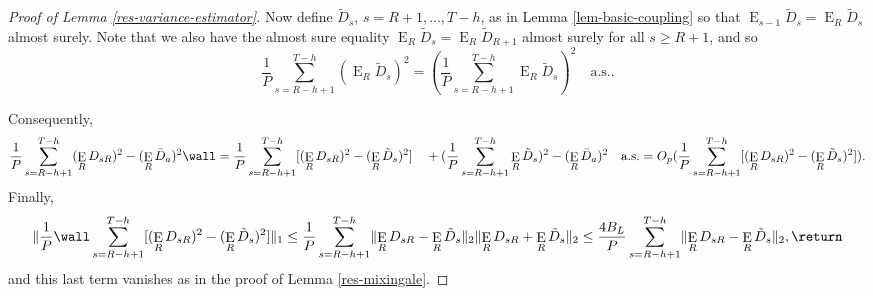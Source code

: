 \documentclass[11pt]{article}
\DeclareMathOperator{\E}{E}
\newcommand{\oosA}{\bar{D}_a}
\newcommand{\oosSum}[2]{\ensuremath{\sum_{#1=R-\h+#2}^{T-\h}}}
\newcommand{\h}{h}
\begin{document}
\begin{proof}[Proof of Lemma \ref{res-variance-estimator}]
Now define $\tilde D_s$, $s = R+1,\dots,T-\h$, as in Lemma
\ref{lem-basic-coupling} so that $\E_{s-1} \tilde D_s = \E_R \tilde
D_s$ almost surely.  Note that we also have the almost sure equality
$\E_R \tilde D_s = \E_R \tilde D_{R+1}$ almost surely for all $s\geq R+1$,
and so
\[
\frac1P \oosSum{s}{1} (\E_R \tilde D_s)^2 = (\frac1P \oosSum{s}{1} \E_R
\tilde D_s)^2 \quad \text{a.s..}
\]

Consequently,
\[
\frac1P \oosSum{s}{1} (\E_R D_{sR})^2 - (\E_R\oosA)^2 \wall = 
\frac1P \oosSum{s}{1} [(\E_R D_{sR})^2 - (\E_R\tilde D_s)^2]\\
\quad+ (\frac1P \oosSum{s}{1} \E_R \tilde D_s)^2 - (\E_R\oosA)^2 \quad \text{a.s}.\\
= O_p(\frac1P \oosSum{s}{1} [(\E_R D_{sR})^2 - (\E_R \tilde D_s)^2]).
\]
Finally, 
\[
\lVert \frac1P \wall\oosSum{s}{1} [(\E_RD_{sR})^2 - (\E_R \tilde D_s)^2] \rVert_1
\\ \leq \frac1P \oosSum{s}{1} \lVert \E_RD_{sR} - \E_R \tilde D_s \rVert_2 \lVert
\E_RD_{sR} + \E_R \tilde D_s \rVert_2
\\ \leq \frac{4 B_L}P \oosSum{s}{1} \lVert \E_RD_{sR} - \E_R \tilde D_s \rVert_2,
\return
\]
and this last term vanishes as in the proof of Lemma
\ref{res-mixingale}.


\end{proof}
\end{document}
